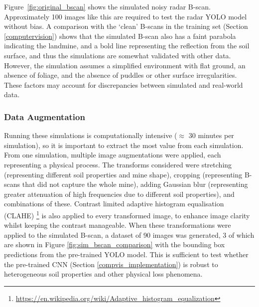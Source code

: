         \noindent Figure~\ref{fig:original_bscan} shows the simulated noisy radar B-scan. Approximately 100 images like this are required to test the radar YOLO model without bias. A comparison with the `clean' B-scans in the training set (Section \ref{computervision}) shows that the simulated B-scan also has a faint parabola indicating the landmine, and a bold line representing the reflection from the soil surface, and thus the simulations are somewhat validated with other data. However, the simulation assumes a simplified environment with flat ground, an absence of foliage, and the absence of puddles or other surface irregularities. These factors may account for discrepancies between simulated and real-world data.

    
    \subsubsection{Data Augmentation}

      Running these simulations is computationally intensive (\(\approx\) 30 minutes per simulation), so it is important to extract the most value from each simulation. From one simulation, multiple image augmentations were applied, each representing a physical process. The transforms considered were stretching (representing different soil properties and mine shape), cropping (representing B-scans that did not capture the whole mine), adding Gaussian blur (representing greater attenuation of high frequencies due to different soil properties), and combinations of these. Contrast limited adaptive histogram equalisation (CLAHE) \footnote{\url{https://en.wikipedia.org/wiki/Adaptive_histogram_equalization}} is also applied to every transformed image, to enhance image clarity whilst keeping the contrast manageable. When these transformations were applied to the simulated B-scan, a dataset of 90 images was generated, 3 of which are shown in Figure \ref{fig:sim_bscan_comparison} with the bounding box predictions from the pre-trained YOLO model. This is sufficient to test whether the pre-trained CNN (Section \ref{compvis_implementation}) is robust to heterogeneous soil properties and other physical loss phenomena.

